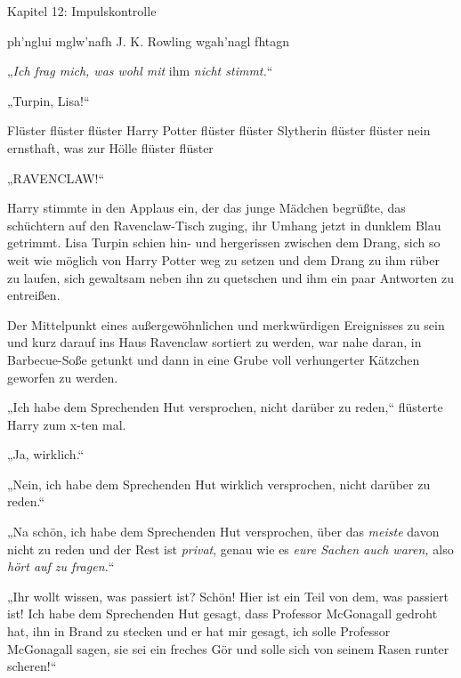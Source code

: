 

\hypertarget{impulskontrolle}{%

Kapitel 12: Impulskontrolle

ph'nglui mglw'nafh J. K. Rowling wgah'nagl fhtagn

\later

„\emph{Ich frag mich, was wohl mit} ihm \emph{nicht stimmt.}“

\later

„Turpin, Lisa!“

Flüster flüster flüster Harry Potter flüster flüster Slytherin flüster flüster nein ernsthaft, was zur Hölle flüster flüster

„RAVENCLAW!“

Harry stimmte in den Applaus ein, der das junge Mädchen begrüßte, das schüchtern auf den Ravenclaw-Tisch zuging, ihr Umhang jetzt in dunklem Blau getrimmt. Lisa Turpin schien hin- und hergerissen zwischen dem Drang, sich so weit wie möglich von Harry Potter weg zu setzen und dem Drang zu ihm rüber zu laufen, sich gewaltsam neben ihn zu quetschen und ihm ein paar Antworten zu entreißen.

Der Mittelpunkt eines außergewöhnlichen und merkwürdigen Ereignisses zu sein und kurz darauf ins Haus Ravenclaw sortiert zu werden, war nahe daran, in Barbecue-Soße getunkt und dann in eine Grube voll verhungerter Kätzchen geworfen zu werden.

„Ich habe dem Sprechenden Hut versprochen, nicht darüber zu reden,“ flüsterte Harry zum x-ten mal.

„Ja, wirklich.“

„Nein, ich habe dem Sprechenden Hut wirklich versprochen, nicht darüber zu reden.“

„Na schön, ich habe dem Sprechenden Hut versprochen, über das \emph{meiste} davon nicht zu reden und der Rest ist \emph{privat}, genau wie es \emph{eure Sachen auch waren,} also \emph{hört auf zu fragen.}“

„Ihr wollt wissen, was passiert ist? Schön! Hier ist ein Teil von dem, was passiert ist! Ich habe dem Sprechenden Hut gesagt, dass Professor McGonagall gedroht hat, ihn in Brand zu stecken und er hat mir gesagt, ich solle Professor McGonagall sagen, sie sei ein freches Gör und solle sich von seinem Rasen runter scheren!“

}
